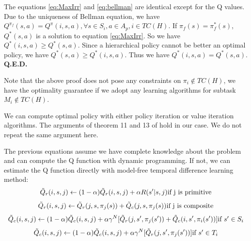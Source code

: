 \documentclass{article} %
\begin{document}
    The equations \ref{eq:MaxIrr} and \ref{eq:bellman} are identical except for the Q values.
    Due to the uniqueness of Bellman equation, we have $Q^{\pi_f}(s, a) = Q^{\pi}(i, s, a), \forall s \in S_i, a \in A_p, i \in TC(H)$. 
    If $\pi_f(s) = \pi^*_f(s)$, $Q^*(s, a)$ is a solution to equation \ref{eq:MaxIrr}. So we have $Q^*(i, s, a) \geq Q^*(s, a)$.
    Since a hierarchical policy cannot be better an optimal policy, we have $Q^*(s, a) \geq Q^*(i, s, a)$.
    Thus we have $Q^*(i, s, a) = Q^*(s, a)$. \textbf{Q.E.D.}

Note that the above proof does not pose any constraints on $\pi_i \notin TC(H)$, we have the optimality
guarantee if we adopt any learning algorithms for subtask $M_i \notin TC(H)$.

We can compute optimal policy with either policy iteration or value iteration algorithms. The arguments of
theorem 11 and 13 of \cite{HORDQ} hold in our case. We do not repeat the same argument here.
 
The previous equations assume we have complete knowledge about the problem and can compute
the Q function with dynamic programming. If not, we can estimate the Q function directly with
model-free temporal difference learning method:
\begin{equation}
    \tilde{Q}_r(i, s, j) \leftarrow
    (1 - \alpha)\tilde{Q}_r(i, s, j) + \alpha R(s'| s, j)   \mbox{if j is primitive} \\
\end{equation}
\begin{equation}
    \tilde{Q}_r(i, s, j) \leftarrow
    \tilde{Q}_r(j, s, \pi_j(s)) + \tilde{Q}_c(j, s, \pi_j(s))  \mbox{if j is composite} \\
    \label{eq:TdQr}
\end{equation}
\begin{equation}
    \tilde{Q}_c(i, s, j) \leftarrow
    (1 - \alpha)\tilde{Q}_c(i, s, j) + \alpha \gamma^N[\tilde{Q}_r(j, s', \pi_j(s')) + \tilde{Q}_c(i, s', \pi_i(s'))]   \mbox{if $s' \in S_i$} \\
\end{equation}
\begin{equation}
    \tilde{Q}_c(i, s, j) \leftarrow
    (1 - \alpha)\tilde{Q}_c(i, s, j) + \alpha \gamma^N[\tilde{Q}_r(j, s', \pi_j(s'))]   \mbox{if $s' \in T_i$} \\
    \label{eq:TdQc}
\end{equation}
\end{document}
